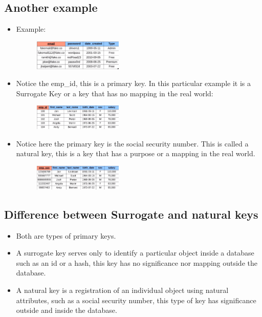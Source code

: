 \subsection{Another example}
\begin{itemize}
    \item Example:
        \begin{figure}[H]
            \centering  
            \includegraphics[width=0.4\textwidth]{./figs/example1.png}
        \end{figure}

    \item Notice the emp\_id, this is a primary key. In this particular example it is a Surrogate Key or a key that has no mapping in the real world: 
        \begin{figure}[H]
            \centering
            \includegraphics[width=0.4\textwidth]{./figs/example2.png}
        \end{figure}

    \item Notice here the primary key is the social security number. This is called a natural key, this is a key that has a purpose or a mapping in the real world.
        \begin{figure}[H]
            \centering
            \includegraphics[width=0.4\textwidth]{./figs/example3.png}
        \end{figure}
\end{itemize}

\subsection{Difference between Surrogate and natural keys}
\begin{itemize}
    \item Both are types of primary keys.
    \item A surrogate key serves only to identify a particular object inside a database such as an id or a hash, this key has no significance nor mapping outside the database.
    \item A natural key is a registration of an individual object using natural attributes, such as a social security number, this type of key has significance outside and inside the database.
\end{itemize}


